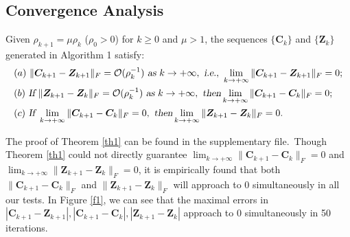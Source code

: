 \subsection{Convergence Analysis}


\begin{theorem}
\label{th1}
Given $\rho_{k+1}=\mu\rho_{k}$ ($\rho_{0}>0$) for $k\ge0$ and $\mu>1$, the sequences $\{\bm{C}_{k}\}$ and $\{\bm{Z}_{k}\}$ generated in Algorithm 1 satisfy:
\begin{align}
&
(a)\ 
\|\bm{C}_{k+1}-\bm{Z}_{k+1}\|_{F}=\mathcal{O}(\rho_{k}^{-1})
\ 
\textsl{as}\ k \to +\infty
,\ 
\textsl{i.e.},\ 
\lim_{k \to +\infty} \|\bm{C}_{k+1}-\bm{Z}_{k+1}\|_{F}=0;
\\
&
(b)\ 
\textsl{If}\ 
\|\bm{Z}_{k+1}-\bm{Z}_{k}\|_{F}=\mathcal{O}(\rho_{k}^{-1})
\ 
\textsl{as}\ k \to +\infty
,\ 
\textsl{then} 
\lim_{k \to +\infty} \|\bm{C}_{k+1}-\bm{C}_{k}\|_{F}=0;
\\
&
(c)\ 
\textsl{If}\ 
\lim_{k \to +\infty} \|\bm{C}_{k+1}-\bm{C}_{k}\|_{F}=0
,\ 
\textsl{then} 
\lim_{k \to +\infty} \|\bm{Z}_{k+1}-\bm{Z}_{k}\|_{F}=0.
\end{align}
\end{theorem}
The proof of Theorem \ref{th1} can be found in the supplementary file.\ Though Theorem \ref{th1} could not directly guarantee $\lim_{k \to +\infty}\|\bm{C}_{k+1}-\bm{C}_{k}\|_{F}=0$ and $\lim_{k \to +\infty}\|\bm{Z}_{k+1}-\bm{Z}_{k}\|_{F}=0$, it is empirically found that both $\|\bm{C}_{k+1}-\bm{C}_{k}\|_{F}$ and $\|\bm{Z}_{k+1}-\bm{Z}_{k}\|_{F}$ will approach to $0$ simultaneously in all our tests. In Figure \ref{f1}, we can see that the maximal errors in $|\bm{C}_{k+1}-\bm{Z}_{k+1}|,|\bm{C}_{k+1}-\bm{C}_{k}|,|\bm{Z}_{k+1}-\bm{Z}_{k}|$ approach to $0$ simultaneously  in 50 iterations.


